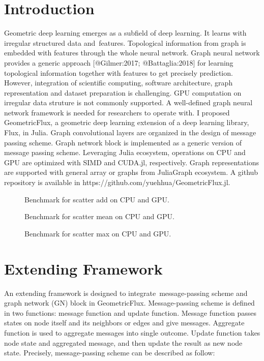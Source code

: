 \documentclass{juliacon}
\begin{document}
\section{Introduction}

Geometric deep learning emerges as a subfield of deep learning. It learns with irregular
structured data and features. Topological information from graph is embedded with features
through the whole neural network. Graph neural network provides a generic approach [@Gilmer:2017; @Battaglia:2018]
for learning topological information together with features to get precisely prediction.
However, integration of scientific computing, software architecture, graph representation
and dataset preparation is challenging. GPU computation on irregular data struture is not
commonly supported. A well-defined graph neural network framework is needed for researchers
to operate with. I proposed GeometricFlux, a geometric deep learning extension of a deep learning
library, Flux, in Julia. Graph convolutional layers are organized in the design of message
passing scheme. Graph network block is implemented as a generic version of message passing
scheme. Leveraging Julia ecosystem, operations on CPU and GPU are optimized with SIMD and
CUDA.jl, respectively. Graph representations are supported with general array or graphs from
JuliaGraph ecosystem.
A github repository is available in https://github.com/yuehhua/GeometricFlux.jl.

\begin{figure*}[t]
\resizebox{180mm}{!}{}
\caption{Benchmark for scatter add on CPU and GPU.}
\label{fig:scatter_add}
\end{figure*}

\begin{figure*}[ht]
\resizebox{180mm}{!}{}
\caption{Benchmark for scatter mean on CPU and GPU.}
\label{fig:scatter_mean}
\end{figure*}

\begin{figure*}[ht]
\resizebox{180mm}{!}{}
\caption{Benchmark for scatter max on CPU and GPU.}
\label{fig:scatter_max}
\end{figure*}

\section{Extending Framework}

An extending framework is designed to integrate message-passing scheme and graph network (GN)
block in GeometricFlux. Message-passing scheme is defined in two functions: message function
and update function. Message function passes states on node itself and its neighbors or edges
and give messages. Aggregate function is used to aggregate messages into single outcome.
Update function takes node state and aggregated message, and then update the result as new
node state. Precisely, message-passing scheme can be described as follow:
\end{document}

